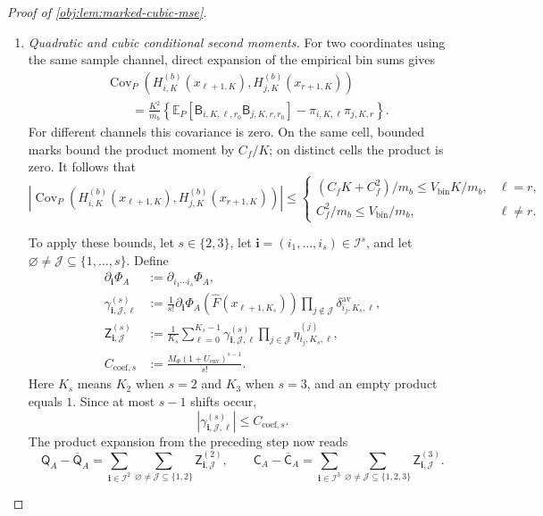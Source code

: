 \documentclass[11pt]{article}
\begin{document}
\begin{proof}[Proof of \cref{obj:lem:marked-cubic-mse}]
\begin{enumerate}
\item \textit{Quadratic and cubic conditional second moments.}
For two coordinates using the same sample channel, direct expansion of the empirical bin sums gives
\[
\begin{aligned}
&\operatorname{Cov}_P\!\left(
H_{i,K}^{(b)}(x_{\ell+1,K}),
H_{j,K}^{(b)}(x_{r+1,K})
\right)\\
&\qquad=
\frac{K^2}{m_b}
\left\{
\mathbb E_P[
\mathsf B_{i,K,\ell,r_0}\mathsf B_{j,K,r,r_0}]
-\pi_{i,K,\ell}\pi_{j,K,r}
\right\}.
\end{aligned}
\]
For different channels this covariance is zero. On the same cell, bounded marks bound the product moment by \(C_f/K\); on distinct cells the product is zero. It follows that
\[
\left|
\operatorname{Cov}_P\!\left(
H_{i,K}^{(b)}(x_{\ell+1,K}),
H_{j,K}^{(b)}(x_{r+1,K})
\right)
\right|
\le
\begin{cases}
(C_fK+C_f^2)/m_b\le V_{\mathrm{bin}}K/m_b,
&\ell=r,\\
C_f^2/m_b\le V_{\mathrm{bin}}/m_b,
&\ell\ne r.
\end{cases}
\]

To apply these bounds, let \(s\in\{2,3\}\), let
\(\boldsymbol i=(i_1,\ldots,i_s)\in\mathcal I^s\), and let
\(\varnothing\ne\mathcal J\subseteq\{1,\ldots,s\}\). Define
\[
\begin{aligned}
\partial_{\boldsymbol i}\Phi_A
&:=\partial_{i_1\cdots i_s}\Phi_A,\\
\gamma^{(s)}_{\boldsymbol i,\mathcal J,\ell}
&:=
\frac1{s!}
\partial_{\boldsymbol i}\Phi_A(\widehat F(x_{\ell+1,K_s}))
\prod_{j\notin\mathcal J}
\delta^{\mathrm{av}}_{i_j,K_s,\ell},\\
\mathsf Z^{(s)}_{\boldsymbol i,\mathcal J}
&:=
\frac1{K_s}\sum_{\ell=0}^{K_s-1}
\gamma^{(s)}_{\boldsymbol i,\mathcal J,\ell}
\prod_{j\in\mathcal J}\eta^{(j)}_{i_j,K_s,\ell},\\
C_{\mathrm{coef},s}
&:=\frac{M_\Phi(1+U_{\mathrm{env}})^{s-1}}{s!}.
\end{aligned}
\]
Here \(K_s\) means \(K_2\) when \(s=2\) and \(K_3\) when \(s=3\), and an empty product equals \(1\). Since at most \(s-1\) shifts occur,
\[
|\gamma^{(s)}_{\boldsymbol i,\mathcal J,\ell}|
\le C_{\mathrm{coef},s}.
\]
The product expansion from the preceding step now reads
\[
\mathsf Q_A-\overline{\mathsf Q}_A
=\sum_{\boldsymbol i\in\mathcal I^2}
\sum_{\varnothing\ne\mathcal J\subseteq\{1,2\}}
\mathsf Z^{(2)}_{\boldsymbol i,\mathcal J},
\qquad
\mathsf C_A-\overline{\mathsf C}_A
=\sum_{\boldsymbol i\in\mathcal I^3}
\sum_{\varnothing\ne\mathcal J\subseteq\{1,2,3\}}
\mathsf Z^{(3)}_{\boldsymbol i,\mathcal J}.
\]


\end{enumerate}
\end{proof}
\end{document}
